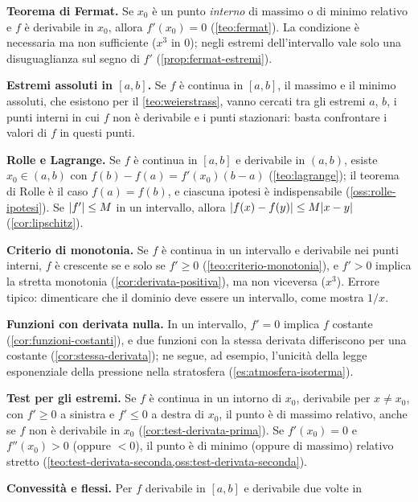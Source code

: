 \begin{puntichiave}
\item \textbf{Teorema di Fermat.} Se $x_{0}$ è un punto \emph{interno} di massimo o di
minimo relativo e $f$ è derivabile in $x_{0}$, allora $f'(x_{0})=0$ (\cref{teo:fermat}).
La condizione è necessaria ma non sufficiente ($x^{3}$ in $0$); negli estremi
dell'intervallo vale solo una disuguaglianza sul segno di $f'$
(\cref{prop:fermat-estremi}).
\item \textbf{Estremi assoluti in $[a,b]$.} Se $f$ è continua in $[a,b]$, il massimo e il
minimo assoluti, che esistono per il \cref{teo:weierstrass}, vanno cercati tra gli
estremi $a$, $b$, i punti interni in cui $f$ non è derivabile e i punti stazionari:
basta confrontare i valori di $f$ in questi punti.
\item \textbf{Rolle e Lagrange.} Se $f$ è continua in $[a,b]$ e derivabile in $(a,b)$,
esiste $x_{0}\in(a,b)$ con $f(b)-f(a)=f'(x_{0})(b-a)$ (\cref{teo:lagrange}); il teorema di
Rolle è il caso $f(a)=f(b)$, e ciascuna ipotesi è indispensabile
(\cref{oss:rolle-ipotesi}). Se $\lvert f'\rvert\le M$ in un intervallo, allora
$\lvert f(x)-f(y)\rvert\le M\lvert x-y\rvert$ (\cref{cor:lipschitz}).
\item \textbf{Criterio di monotonia.} Se $f$ è continua in un intervallo e derivabile nei
punti interni, $f$ è crescente se e solo se $f'\ge0$ (\cref{teo:criterio-monotonia}), e
$f'>0$ implica la stretta monotonia (\cref{cor:derivata-positiva}), ma non viceversa
($x^{3}$). Errore tipico: dimenticare che il dominio deve essere un intervallo, come
mostra $1/x$.
\item \textbf{Funzioni con derivata nulla.} In un intervallo, $f'=0$ implica $f$ costante
(\cref{cor:funzioni-costanti}), e due funzioni con la stessa derivata differiscono per
una costante (\cref{cor:stessa-derivata}); ne segue, ad esempio, l'unicità della legge
esponenziale della pressione nella stratosfera (\cref{es:atmosfera-isoterma}).
\item \textbf{Test per gli estremi.} Se $f$ è continua in un intorno di $x_{0}$, derivabile
per $x\neq x_{0}$, con $f'\ge0$ a sinistra e $f'\le0$ a destra di $x_{0}$, il punto è di
massimo relativo, anche se $f$ non è derivabile in $x_{0}$
(\cref{cor:test-derivata-prima}). Se $f'(x_{0})=0$ e $f''(x_{0})>0$ (oppure
$<0$), il punto è di minimo (oppure di massimo) relativo stretto
(\cref{teo:test-derivata-seconda,oss:test-derivata-seconda}).
\item \textbf{Convessità e flessi.} Per $f$ derivabile in $[a,b]$ e derivabile due volte in

\end{puntichiave}
